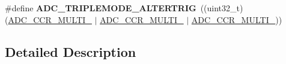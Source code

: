 \begin{DoxyCompactItemize}
\item 
\mbox{\label{group___a_d_c_ex___common__mode_ga5ad65e0e5b27f2f72d4856b3651f0b8b}} 
\#define {\bfseries A\+D\+C\+\_\+\+T\+R\+I\+P\+L\+E\+M\+O\+D\+E\+\_\+\+A\+L\+T\+E\+R\+T\+R\+IG}~((uint32\+\_\+t)(\mbox{\hyperlink{group___peripheral___registers___bits___definition_ga5087b3cb0d4570b80b3138c277bcbf6c}{A\+D\+C\+\_\+\+C\+C\+R\+\_\+\+M\+U\+L\+T\+I\+\_}} $\vert$ \mbox{\hyperlink{group___peripheral___registers___bits___definition_gae55be7b911b4c0272543f98a0dba5f20}{A\+D\+C\+\_\+\+C\+C\+R\+\_\+\+M\+U\+L\+T\+I\+\_}} $\vert$ \mbox{\hyperlink{group___peripheral___registers___bits___definition_gae4e7104ce01e3a79b8f6138d87dc3684}{A\+D\+C\+\_\+\+C\+C\+R\+\_\+\+M\+U\+L\+T\+I\+\_}}))
\end{DoxyCompactItemize}


\subsection{Detailed Description}
